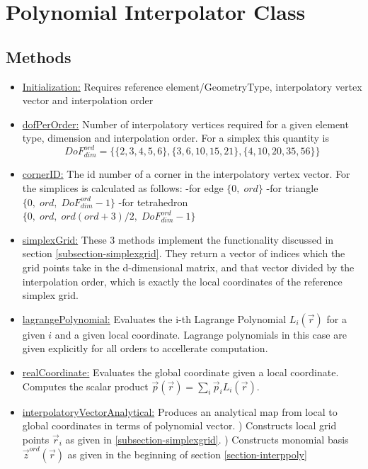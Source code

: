 \section{Polynomial Interpolator Class}

\subsection{Methods}

\begin{itemize}
	\item \uline{Initialization:} Requires reference element/GeometryType, interpolatory vertex vector and interpolation order
	\item \uline{dofPerOrder:} Number of interpolatory vertices required for a given element type, dimension and interpolation order. For a simplex this quantity is
	\[ {DoF}_{dim}^{ord} = \{ \{ 2,3,4,5,6 \}, \{ 3,6,10,15,21 \}, \{ 4,10,20,35,56 \} \} \]
	\item \uline{cornerID:} The id number of a corner in the interpolatory vertex vector. For the simplices is calculated as follows:
		\subitem -for edge $\{ 0, \; ord \}$
		\subitem -for triangle $\{0, \; ord, \; {DoF}_{dim}^{ord} - 1\}$
		\subitem -for tetrahedron $\{0, \; ord, \; ord (ord + 3) / 2, \; {DoF}_{dim}^{ord} - 1\}$
	\item \uline{simplexGrid:} These 3 methods implement the functionality discussed in section \ref{subsection-simplexgrid}. They return a vector of indices which the grid points take in the d-dimensional matrix, and that vector divided by the interpolation order, which is exactly the local coordinates of the reference simplex grid.
	\item \uline{lagrangePolynomial:} Evaluates the i-th Lagrange Polynomial $L_i(\vec{r})$ for a given $i$ and a given local coordinate. Lagrange polynomials in this case are given explicitly for all orders to accellerate computation.
	\item \uline{realCoordinate:} Evaluates the global coordinate given a local coordinate. Computes the scalar product $\vec{p}(\vec{r}) = \sum_i \vec{p}_i L_i (\vec{r})$.
	\item \uline{interpolatoryVectorAnalytical:} Produces an analytical map from local to global coordinates in terms of polynomial vector.
		) Constructs local grid points $\vec{r}_i$ as given in \ref{subsection-simplexgrid}.		
		) Constructs monomial basis $\vec{z}^{ord}(\vec{r})$ as given in the beginning of section \ref{section-interppoly}

\end{itemize}
